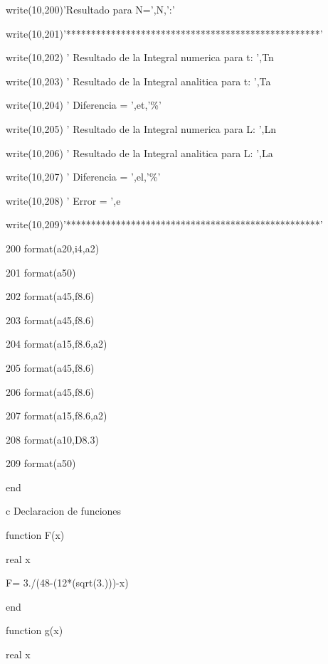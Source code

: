       write(10,200)'Resultado para N=',N,':'

      write(10,201)'***************************************************'

      write(10,202) ' Resultado de la Integral numerica para 
t: ',Tn

      write(10,203) ' Resultado de la Integral analitica para 
t: ',Ta

      write(10,204) ' Diferencia = ',et,'\%'

      write(10,205) ' Resultado de la Integral numerica para 
L: ',Ln

      write(10,206) ' Resultado de la Integral analitica para 
L: ',La

      write(10,207) ' Diferencia = ',el,'\%'

      write(10,208) ' Error = ',e

      write(10,209)'***************************************************'





200   format(a20,i4,a2)

201   format(a50)

202   format(a45,f8.6)

203   format(a45,f8.6)

204   format(a15,f8.6,a2)

205   format(a45,f8.6)

206   format(a45,f8.6)

207   format(a15,f8.6,a2)

208   format(a10,D8.3)

209   format(a50)



      end

      

      

      

      

      

      

c           Declaracion de funciones

      function F(x)

      real x

      F= 3./(48-(12*(sqrt(3.)))-x)

      end





      function g(x)

      real x

